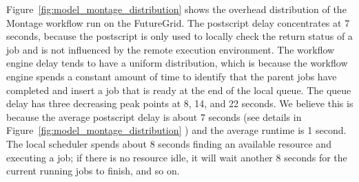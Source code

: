 Figure~\ref{fig:model_montage_distribution} shows the overhead distribution of the Montage workflow run on the FutureGrid. The postscript delay concentrates at 7 seconds, because the postscript is only used to locally check the return status of a job and is not influenced by the remote execution environment. The workflow engine delay tends to have a uniform distribution, which is because the workflow engine spends a constant amount of time to identify that the parent jobs have completed and insert a job that is ready at the end of the local queue. 
The queue delay has three decreasing peak points at 8, 14, and 22 seconds. We believe this is because the average postscript delay is about 7 seconds (see details in Figure~\ref{fig:model_montage_distribution} ) and the average runtime is 1 second. The local scheduler spends about 8 seconds finding an available resource and executing a job; if there is no resource idle, it will wait another 8 seconds for the current running jobs to finish, and so on. 

%

